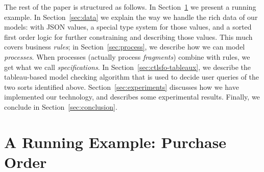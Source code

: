 \documentclass{llncs}
\begin{document}
The rest of the paper is structured as follows.
In Section~\ref{sec:example} we present a running example.
In Section~\ref{sec:data} we explain the way we handle the rich data of our models: with JSON values, a special type system for those values, and a sorted first order logic for further constraining and describing those values.
This much covers business \emph{rules}; in Section~\ref{sec:process}, we describe how we can model \emph{processes}.
When processes (actually process \emph{fragments}) combine with rules, we get what we call \emph{specifications}.
In Section~\ref{sec:ctlsfo-tableaux}, we describe the tableau-based model checking algorithm that is used to decide user queries of the two sorts identified above.
Section~\ref{sec:experiments} discusses how we have implemented our technology, and describes some experimental results.
Finally, we conclude in Section~\ref{sec:conclusion}.








\section{A Running Example: Purchase Order}
\label{sec:example}
\end{document}
